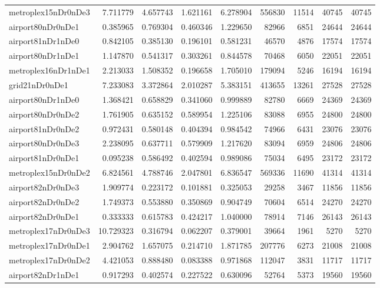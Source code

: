 \begin{longtable}{|l|r|r|r|r|r|r|r|r|}
metroplex15nDr0nDe3 & 7.711779 & 4.657743 & 1.621161 & 6.278904 & 556830 & 11514 & 40745 & 40745 \\
airport80nDr0nDe1 & 0.385965 & 0.769304 & 0.460346 & 1.229650 & 82966 & 6851 & 24644 & 24644 \\
airport81nDr1nDe0 & 0.842105 & 0.385130 & 0.196101 & 0.581231 & 46570 & 4876 & 17574 & 17574 \\
airport80nDr1nDe1 & 1.147870 & 0.541317 & 0.303261 & 0.844578 & 70468 & 6050 & 22051 & 22051 \\
metroplex16nDr1nDe1 & 2.213033 & 1.508352 & 0.196658 & 1.705010 & 179094 & 5246 & 16194 & 16194 \\
grid21nDr0nDe1 & 7.233083 & 3.372864 & 2.010287 & 5.383151 & 413655 & 13261 & 27528 & 27528 \\
airport80nDr1nDe0 & 1.368421 & 0.658829 & 0.341060 & 0.999889 & 82780 & 6669 & 24369 & 24369 \\
airport80nDr0nDe2 & 1.761905 & 0.635152 & 0.589954 & 1.225106 & 83088 & 6955 & 24800 & 24800 \\
airport81nDr0nDe2 & 0.972431 & 0.580148 & 0.404394 & 0.984542 & 74966 & 6431 & 23076 & 23076 \\
airport80nDr0nDe3 & 2.238095 & 0.637711 & 0.579909 & 1.217620 & 83094 & 6959 & 24806 & 24806 \\
airport81nDr0nDe1 & 0.095238 & 0.586492 & 0.402594 & 0.989086 & 75034 & 6495 & 23172 & 23172 \\
metroplex15nDr0nDe2 & 6.824561 & 4.788746 & 2.047801 & 6.836547 & 569336 & 11690 & 41314 & 41314 \\
airport82nDr0nDe3 & 1.909774 & 0.223172 & 0.101881 & 0.325053 & 29258 & 3467 & 11856 & 11856 \\
airport82nDr0nDe2 & 1.749373 & 0.553880 & 0.350869 & 0.904749 & 70604 & 6514 & 24270 & 24270 \\
airport82nDr0nDe1 & 0.333333 & 0.615783 & 0.424217 & 1.040000 & 78914 & 7146 & 26143 & 26143 \\
metroplex17nDr0nDe3 & 10.729323 & 0.316794 & 0.062207 & 0.379001 & 39664 & 1961 & 5270 & 5270 \\
metroplex17nDr0nDe1 & 2.904762 & 1.657075 & 0.214710 & 1.871785 & 207776 & 6273 & 21008 & 21008 \\
metroplex17nDr0nDe2 & 4.421053 & 0.888480 & 0.083388 & 0.971868 & 112047 & 3831 & 11717 & 11717 \\
airport82nDr1nDe1 & 0.917293 & 0.402574 & 0.227522 & 0.630096 & 52764 & 5373 & 19560 & 19560 \\

\end{longtable}
